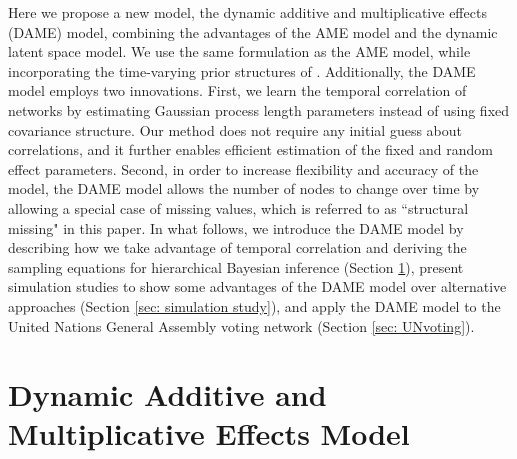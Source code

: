 \documentclass[a4paper]{article}
\begin{document}
		Here we propose a new model, the dynamic additive and multiplicative effects (DAME) model, combining the advantages of the AME model and the dynamic latent space model. We use the same formulation as the AME model, while incorporating the time-varying prior structures of \cite{durante2013nonparametric,durante2014bayesian2,durante2014bayesian}. Additionally, the DAME model employs two innovations. First, we learn the temporal correlation of networks by estimating Gaussian process length parameters instead of using fixed covariance structure. Our method does not require any initial guess about correlations, and it further enables efficient estimation of the fixed and random effect parameters. Second, in order to increase flexibility and accuracy of the model, the DAME model allows the number of nodes to change over time by allowing a special case of missing values, which is referred to as ``structural missing" in this paper. In what follows, we introduce the DAME model by describing how we take advantage of temporal correlation and deriving the sampling equations for hierarchical Bayesian inference (Section \ref{sec: DAME}), present simulation studies to show some advantages of the DAME model over alternative approaches (Section \ref{sec: simulation study}), and apply the DAME model to the United Nations General Assembly voting network (Section \ref{sec: UNvoting}).
		
		\section{Dynamic Additive and Multiplicative Effects Model}\label{sec: DAME}
\end{document}
